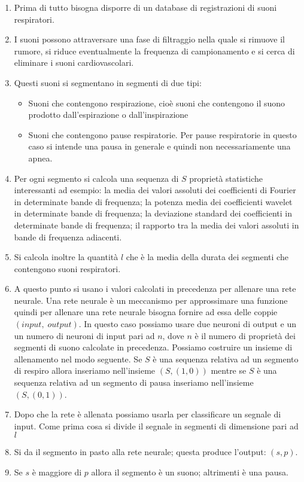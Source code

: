 \begin{enumerate}
  \item 
    Prima di tutto bisogna disporre di un database di registrazioni di suoni respiratori. 
  \item
    I suoni possono attraversare una fase di filtraggio nella quale si rimuove il rumore, si riduce eventualmente la frequenza di campionamento e si cerca di eliminare i suoni cardiovascolari.
  \item
    Questi suoni si segmentano in segmenti di due tipi:
    \begin{itemize}
      \item 
	Suoni che contengono respirazione, cio\`e suoni che contengono il suono prodotto dall'espirazione o dall'inspirazione
      \item
	Suoni che contengono pause respiratorie. 
	Per pause respiratorie in questo caso si intende una pausa in generale e quindi non necessariamente una apnea.
    \end{itemize}
  \item
    Per ogni segmento si calcola una sequenza di $S$ propriet\`a statistiche interessanti ad esempio: la media dei valori assoluti dei coefficienti di Fourier in determinate bande di frequenza; la potenza media dei coefficienti wavelet in determinate bande di frequenza; la deviazione standard dei coefficienti in determinate bande di frequenza; il rapporto tra la media dei valori assoluti in bande di frequenza adiacenti. 
  \item
    Si calcola inoltre la quantit\`a $l$ che \`e la media della durata dei segmenti che contengono suoni respiratori.
  \item
    A questo punto si usano i valori calcolati in precedenza per allenare una rete neurale. 
    Una rete neurale \`e un meccanismo per approssimare una funzione quindi per allenare una rete neurale bisogna fornire ad essa delle coppie $(input,\; output)$. 
    In questo caso possiamo usare due neuroni di output e un un numero di neuroni di input pari ad $n$, dove $n$ \`e il numero di propriet\`a dei segmenti di suono calcolate in precedenza. 
    Possiamo costruire un insieme di allenamento nel modo seguente. 
    Se $S$ \`e una sequenza  relativa ad un segmento di respiro allora inseriamo nell'insieme $(S, (1,0))$ mentre se $S$ \`e una sequenza relativa ad un segmento di pausa inseriamo nell'insieme $(S, (0,1))$. 
  \item	
    Dopo che la rete \`e allenata possiamo usarla per classificare un segnale di input. 
    Come prima cosa si divide il segnale in segmenti di dimensione pari ad $l$
  \item
    Si da il segmento in pasto alla rete neurale; questa produce l'output: $(s,p)$. 
  \item
    Se $s$ \`e maggiore di $p$ allora il segmento \`e un suono; altrimenti \`e una pausa.
\end{enumerate}


